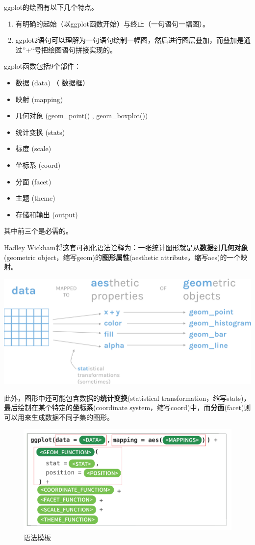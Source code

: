 \documentclass[
]{book}
\providecommand{\tightlist}{%
  \setlength{\itemsep}{0pt}\setlength{\parskip}{0pt}}
\begin{document}
ggplot的绘图有以下几个特点。

\begin{enumerate}
\def\labelenumi{\arabic{enumi}.}
\item
  有明确的起始（以ggplot函数开始）与终止（一句语句一幅图）。
\item
  ggplot2语句可以理解为一句语句绘制一幅图，然后进行图层叠加，而叠加是通过''+``号把绘图语句拼接实现的。
\end{enumerate}

ggplot函数包括9个部件：

\begin{itemize}
\tightlist
\item
  数据 (data) （ 数据框）
\item
  映射 (mapping)
\item
  几何对象 (geom\_point() , geom\_boxplot())
\item
  统计变换 (stats)
\item
  标度 (scale)
\item
  坐标系 (coord)
\item
  分面 (facet)
\item
  主题 (theme)
\item
  存储和输出 (output)
\end{itemize}

其中前三个是必需的。

Hadley
Wickham将这套可视化语法诠释为：一张统计图形就是从\textbf{数据}到\textbf{几何对象}(geometric
object，缩写geom)的\textbf{图形属性}(aesthetic
attribute，缩写aes)的一个映射。

\includegraphics{figure/10.png}

此外，图形中还可能包含数据的\textbf{统计变换}(statistical
transformation，缩写stats)，最后绘制在某个特定的\textbf{坐标系}(coordinate
system，缩写coord)中，而\textbf{分面}(facet)则可以用来生成数据不同子集的图形。

\begin{figure}
\centering
\includegraphics{figure/11.png}
\caption{语法模板}
\end{figure}
\end{document}
